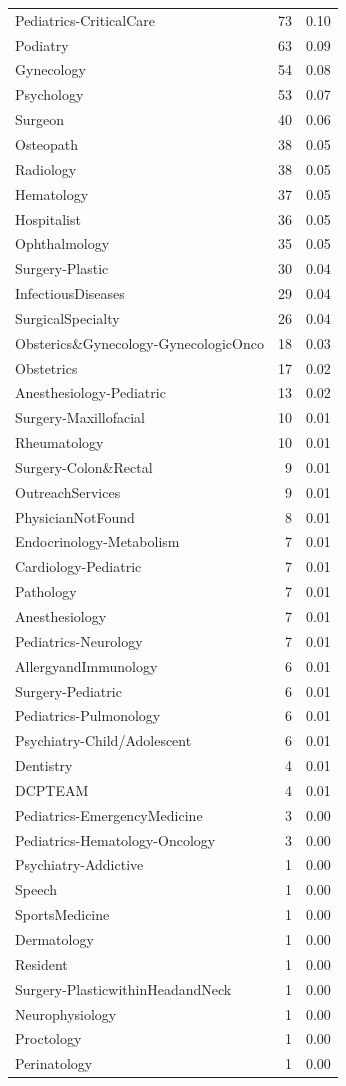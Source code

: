 \documentclass[
]{article}
\begin{document}
\begin{longtable}[t]{lrr}
Pediatrics-CriticalCare & 73 & 0.10\\
Podiatry & 63 & 0.09\\
\addlinespace
Gynecology & 54 & 0.08\\
Psychology & 53 & 0.07\\
Surgeon & 40 & 0.06\\
Osteopath & 38 & 0.05\\
Radiology & 38 & 0.05\\
\addlinespace
Hematology & 37 & 0.05\\
Hospitalist & 36 & 0.05\\
Ophthalmology & 35 & 0.05\\
Surgery-Plastic & 30 & 0.04\\
InfectiousDiseases & 29 & 0.04\\
\addlinespace
SurgicalSpecialty & 26 & 0.04\\
Obsterics\&Gynecology-GynecologicOnco & 18 & 0.03\\
Obstetrics & 17 & 0.02\\
Anesthesiology-Pediatric & 13 & 0.02\\
Surgery-Maxillofacial & 10 & 0.01\\
\addlinespace
Rheumatology & 10 & 0.01\\
Surgery-Colon\&Rectal & 9 & 0.01\\
OutreachServices & 9 & 0.01\\
PhysicianNotFound & 8 & 0.01\\
Endocrinology-Metabolism & 7 & 0.01\\
\addlinespace
Cardiology-Pediatric & 7 & 0.01\\
Pathology & 7 & 0.01\\
Anesthesiology & 7 & 0.01\\
Pediatrics-Neurology & 7 & 0.01\\
AllergyandImmunology & 6 & 0.01\\
\addlinespace
Surgery-Pediatric & 6 & 0.01\\
Pediatrics-Pulmonology & 6 & 0.01\\
Psychiatry-Child/Adolescent & 6 & 0.01\\
Dentistry & 4 & 0.01\\
DCPTEAM & 4 & 0.01\\
\addlinespace
Pediatrics-EmergencyMedicine & 3 & 0.00\\
Pediatrics-Hematology-Oncology & 3 & 0.00\\
Psychiatry-Addictive & 1 & 0.00\\
Speech & 1 & 0.00\\
SportsMedicine & 1 & 0.00\\
\addlinespace
Dermatology & 1 & 0.00\\
Resident & 1 & 0.00\\
Surgery-PlasticwithinHeadandNeck & 1 & 0.00\\
Neurophysiology & 1 & 0.00\\
Proctology & 1 & 0.00\\
\addlinespace
Perinatology & 1 & 0.00\\*
\end{longtable}
\end{document}

